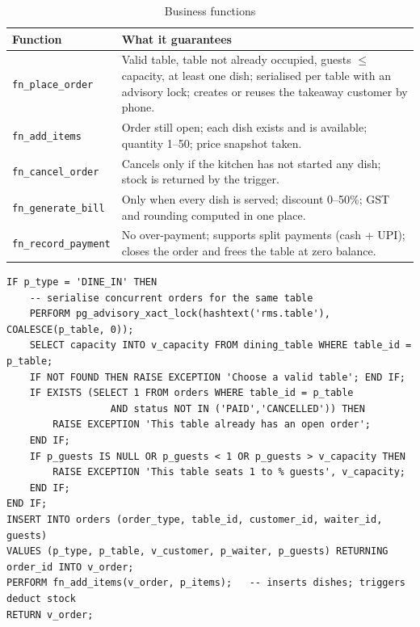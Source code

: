 \documentclass[11pt,a4paper]{report}
\begin{document}
\begin{table}[H]
    \centering
    \caption{Business functions}
    \small
    \begin{tabularx}{\textwidth}{|l|Y|}
        \hline
        \textbf{Function} & \textbf{What it guarantees} \\ \hline
        \texttt{fn\_place\_order} & Valid table, table not already occupied, guests $\le$ capacity, at least one dish; serialised per table with an advisory lock; creates or reuses the takeaway customer by phone. \\ \hline
        \texttt{fn\_add\_items} & Order still open; each dish exists and is available; quantity 1--50; price snapshot taken. \\ \hline
        \texttt{fn\_cancel\_order} & Cancels only if the kitchen has not started any dish; stock is returned by the trigger. \\ \hline
        \texttt{fn\_generate\_bill} & Only when every dish is served; discount 0--50\%; GST and rounding computed in one place. \\ \hline
        \texttt{fn\_record\_payment} & No over-payment; supports split payments (cash + UPI); closes the order and frees the table at zero balance. \\ \hline
    \end{tabularx}
\end{table}

\begin{lstlisting}[caption={Placing an order (abridged from \texttt{fn\_place\_order})}]
IF p_type = 'DINE_IN' THEN
    -- serialise concurrent orders for the same table
    PERFORM pg_advisory_xact_lock(hashtext('rms.table'), COALESCE(p_table, 0));
    SELECT capacity INTO v_capacity FROM dining_table WHERE table_id = p_table;
    IF NOT FOUND THEN RAISE EXCEPTION 'Choose a valid table'; END IF;
    IF EXISTS (SELECT 1 FROM orders WHERE table_id = p_table
                  AND status NOT IN ('PAID','CANCELLED')) THEN
        RAISE EXCEPTION 'This table already has an open order';
    END IF;
    IF p_guests IS NULL OR p_guests < 1 OR p_guests > v_capacity THEN
        RAISE EXCEPTION 'This table seats 1 to % guests', v_capacity;
    END IF;
END IF;
INSERT INTO orders (order_type, table_id, customer_id, waiter_id, guests)
VALUES (p_type, p_table, v_customer, p_waiter, p_guests) RETURNING order_id INTO v_order;
PERFORM fn_add_items(v_order, p_items);   -- inserts dishes; triggers deduct stock
RETURN v_order;
\end{lstlisting}
\end{document}
